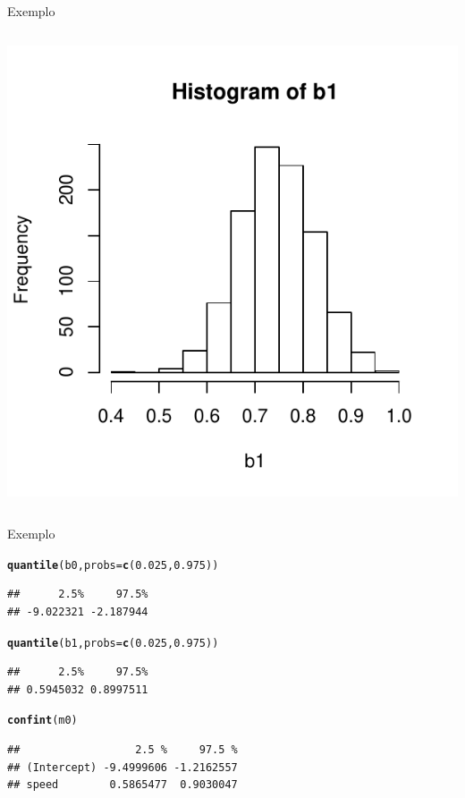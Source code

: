 \documentclass{beamer}\usepackage[]{graphicx}\usepackage[]{color}
\makeatletter
\newcommand{\hlnum}[1]{\textcolor[rgb]{0.686,0.059,0.569}{#1}}%
\newcommand{\hlstd}[1]{\textcolor[rgb]{0.345,0.345,0.345}{#1}}%
\newcommand{\hlkwc}[1]{\textcolor[rgb]{0.333,0.667,0.333}{#1}}%
\newcommand{\hlkwd}[1]{\textcolor[rgb]{0.737,0.353,0.396}{\textbf{#1}}}%
\newenvironment{kframe}{%
 \def\at@end@of@kframe{}%
 \ifinner\ifhmode%
  \def\at@end@of@kframe{\end{minipage}}%
  \begin{minipage}{\columnwidth}%
 \fi\fi%
 \def\FrameCommand##1{\hskip\@totalleftmargin \hskip-\fboxsep
 \colorbox{shadecolor}{##1}\hskip-\fboxsep
     \hskip-\linewidth \hskip-\@totalleftmargin \hskip\columnwidth}%
 \MakeFramed {\advance\hsize-\width
   \@totalleftmargin\z@ \linewidth\hsize
   \@setminipage}}%
 {\par\unskip\endMakeFramed%
 \at@end@of@kframe}
\newenvironment{knitrout}{}{} %
\renewenvironment{knitrout}{\setlength{\topsep}{0mm}}{}
\makeatother
\begin{document}
\begin{frame}[fragile]{Exemplo}
\begin{columns}[c]
\begin{knitrout}
\includegraphics[width=.7\linewidth]{figure/v14-2} 

\end{knitrout}

\end{columns}

\end{frame}


\begin{frame}[fragile]{Exemplo}

\begin{knitrout}\tiny
{}\color{fgcolor}\begin{kframe}
\begin{alltt}
\hlkwd{quantile}\hlstd{(b0,}\hlkwc{probs}\hlstd{=}\hlkwd{c}\hlstd{(}\hlnum{0.025}\hlstd{,}\hlnum{0.975}\hlstd{))}
\end{alltt}
\begin{verbatim}
##      2.5%     97.5% 
## -9.022321 -2.187944
\end{verbatim}
\begin{alltt}
\hlkwd{quantile}\hlstd{(b1,}\hlkwc{probs}\hlstd{=}\hlkwd{c}\hlstd{(}\hlnum{0.025}\hlstd{,}\hlnum{0.975}\hlstd{))}
\end{alltt}
\begin{verbatim}
##      2.5%     97.5% 
## 0.5945032 0.8997511
\end{verbatim}
\begin{alltt}
\hlkwd{confint}\hlstd{(m0)}
\end{alltt}
\begin{verbatim}
##                  2.5 %     97.5 %
## (Intercept) -9.4999606 -1.2162557
## speed        0.5865477  0.9030047
\end{verbatim}
\end{kframe}
\end{knitrout}

\end{frame}
\end{document}
